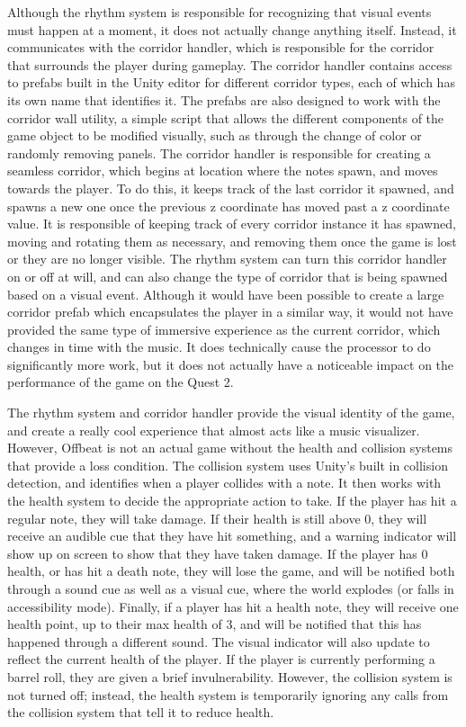 \documentclass[10pt,twocolumn]{article}
\begin{document}
Although the rhythm system is responsible for recognizing that visual events must happen at a moment, it does not actually change anything itself. Instead, it communicates with the corridor handler, which is responsible for the corridor that surrounds the player during gameplay. The corridor handler contains access to prefabs built in the Unity editor for different corridor types, each of which has its own name that identifies it. The prefabs are also designed to work with the corridor wall utility, a simple script that allows the different components of the game object to be modified visually, such as through the change of color or randomly removing panels. The corridor handler is responsible for creating a seamless corridor, which begins at location where the notes spawn, and moves towards the player. To do this, it keeps track of the last corridor it spawned, and spawns a new one once the previous z coordinate has moved past a z coordinate value. It is responsible of keeping track of every corridor instance it has spawned, moving and rotating them as necessary, and removing them once the game is lost or they are no longer visible. The rhythm system can turn this corridor handler on or off at will, and can also change the type of corridor that is being spawned based on a visual event. Although it would have been possible to create a large corridor prefab which encapsulates the player in a similar way, it would not have provided the same type of immersive experience as the current corridor, which changes in time with the music. It does technically cause the processor to do significantly more work, but it does not actually have a noticeable impact on the performance of the game on the Quest 2.

The rhythm system and corridor handler provide the visual identity of the game, and create a really cool experience that almost acts like a music visualizer. However, Offbeat is not an actual game without the health and collision systems that provide a loss condition. The collision system uses Unity's built in collision detection\cite{UnityCollision}, and identifies when a player collides with a note. It then works with the health system to decide the appropriate action to take. If the player has hit a regular note, they will take damage. If their health is still above 0, they will receive an audible cue that they have hit something, and a warning indicator will show up on screen to show that they have taken damage. If the player has 0 health, or has hit a death note, they will lose the game, and will be notified both through a sound cue as well as a visual cue, where the world explodes (or falls in accessibility mode). Finally, if a player has hit a health note, they will receive one health point, up to their max health of 3, and will be notified that this has happened through a different sound. The visual indicator will also update to reflect the current health of the player. If the player is currently performing a barrel roll, they are given a brief invulnerability. However, the collision system is not turned off; instead, the health system is temporarily ignoring any calls from the collision system that tell it to reduce health.
\end{document}
